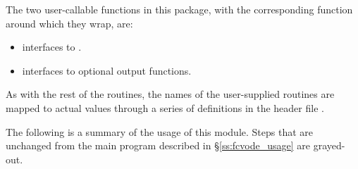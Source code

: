 The two user-callable functions in this package, with the corresponding
{\cvode} function around which they wrap, are:
\begin{itemize}
\item {}
  interfaces to .
\item {}
  interfaces to {\cvbandpre} optional output functions.
\end{itemize}

As with the rest of the {\fcvode} routines, the names of the user-supplied
routines are mapped to actual values through a series of definitions in the
header file .

The following is a summary of the usage of this module. Steps that are unchanged
from the main program described in \S\ref{ss:fcvode_usage} are grayed-out.

